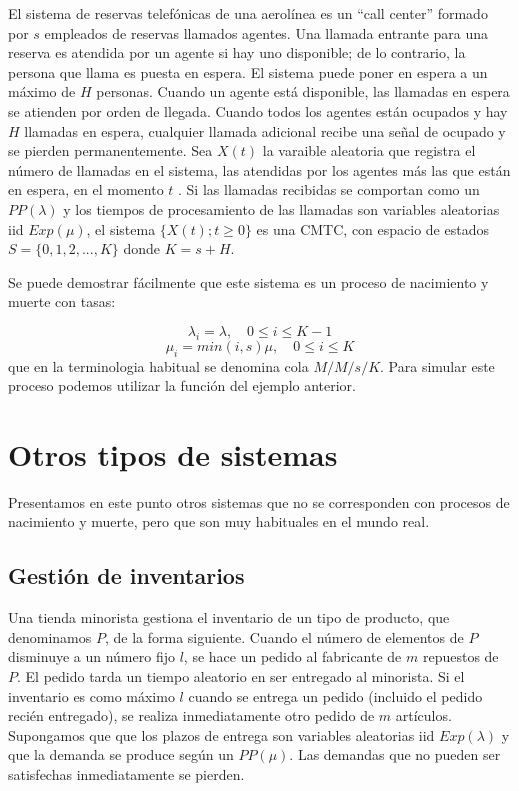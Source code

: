 \documentclass[
]{book}
\theoremstyle{definition}
\theoremstyle{definition}
\theoremstyle{definition}
\theoremstyle{definition}
\theoremstyle{remark}
\begin{document}
El sistema de reservas telefónicas de una aerolínea es un ``call center'' formado por \(s\) empleados de reservas llamados agentes. Una llamada entrante para una reserva es atendida por un agente si hay uno disponible; de lo contrario, la persona que llama es puesta en espera. El sistema puede poner en espera a un máximo de \(H\) personas. Cuando un agente está disponible, las llamadas en espera se atienden por orden de llegada. Cuando todos los agentes están ocupados y hay \(H\) llamadas en espera, cualquier llamada adicional recibe una señal de ocupado y se pierden permanentemente. Sea \(X(t)\) la varaible aleatoria que registra el número de llamadas en el sistema, las atendidas por los agentes más las que están en espera, en el momento \(t\) . Si las llamadas recibidas se comportan como un \(PP(\lambda)\) y los tiempos de procesamiento de las llamadas son variables aleatorias iid \(Exp(\mu)\), el sistema \(\{X(t); t \geq 0\}\) es una CMTC, con espacio de estados \(S = \{0, 1, 2,...,K\}\) donde \(K = s + H\).

Se puede demostrar fácilmente que este sistema es un proceso de nacimiento y muerte con tasas:

\[\lambda_i = \lambda, \quad 0 \leq i \leq K-1\] \[\mu_i = min(i, s)\mu, \quad 0 \leq i \leq K\] que en la terminologia habitual se denomina cola \(M/M/s/K\). Para simular este proceso podemos utilizar la función del ejemplo anterior.

\hypertarget{CMTCE}{%
\section{Otros tipos de sistemas}\label{CMTCE}}

Presentamos en este punto otros sistemas que no se corresponden con procesos de nacimiento y muerte, pero que son muy habituales en el mundo real.

\hypertarget{gestiuxf3n-de-inventarios}{%
\subsection{Gestión de inventarios}\label{gestiuxf3n-de-inventarios}}

Una tienda minorista gestiona el inventario de un tipo de producto, que denominamos \(P\), de la forma siguiente. Cuando el número de elementos de \(P\) disminuye a un número fijo \(l\), se hace un pedido al fabricante de \(m\) repuestos de \(P\). El pedido tarda un tiempo aleatorio en ser entregado al minorista. Si el inventario es como máximo \(l\) cuando se entrega un pedido (incluido el pedido recién entregado), se realiza inmediatamente otro pedido de \(m\) artículos. Supongamos que que los plazos de entrega son variables aleatorias iid \(Exp(\lambda)\) y que la demanda se produce según un \(PP(\mu)\). Las demandas que no pueden ser satisfechas inmediatamente se pierden.
\end{document}
